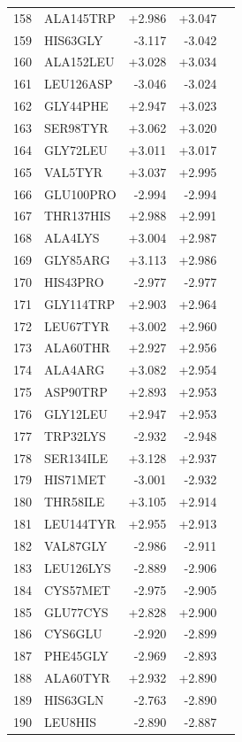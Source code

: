 \begin{longtable}{r l r r c}
158 & ALA145TRP & +2.986 & +3.047 &  \\
159 & HIS63GLY & -3.117 & -3.042 &  \\
160 & ALA152LEU & +3.028 & +3.034 &  \\
161 & LEU126ASP & -3.046 & -3.024 &  \\
162 & GLY44PHE & +2.947 & +3.023 &  \\
163 & SER98TYR & +3.062 & +3.020 &  \\
164 & GLY72LEU & +3.011 & +3.017 &  \\
165 & VAL5TYR & +3.037 & +2.995 &  \\
166 & GLU100PRO & -2.994 & -2.994 &  \\
167 & THR137HIS & +2.988 & +2.991 &  \\
168 & ALA4LYS & +3.004 & +2.987 &  \\
169 & GLY85ARG & +3.113 & +2.986 &  \\
170 & HIS43PRO & -2.977 & -2.977 &  \\
171 & GLY114TRP & +2.903 & +2.964 &  \\
172 & LEU67TYR & +3.002 & +2.960 &  \\
173 & ALA60THR & +2.927 & +2.956 &  \\
174 & ALA4ARG & +3.082 & +2.954 &  \\
175 & ASP90TRP & +2.893 & +2.953 &  \\
176 & GLY12LEU & +2.947 & +2.953 &  \\
177 & TRP32LYS & -2.932 & -2.948 &  \\
178 & SER134ILE & +3.128 & +2.937 &  \\
179 & HIS71MET & -3.001 & -2.932 &  \\
180 & THR58ILE & +3.105 & +2.914 &  \\
181 & LEU144TYR & +2.955 & +2.913 &  \\
182 & VAL87GLY & -2.986 & -2.911 &  \\
183 & LEU126LYS & -2.889 & -2.906 &  \\
184 & CYS57MET & -2.975 & -2.905 &  \\
185 & GLU77CYS & +2.828 & +2.900 &  \\
186 & CYS6GLU & -2.920 & -2.899 &  \\
187 & PHE45GLY & -2.969 & -2.893 &  \\
188 & ALA60TYR & +2.932 & +2.890 &  \\
189 & HIS63GLN & -2.763 & -2.890 &  \\
190 & LEU8HIS & -2.890 & -2.887 &  \\

\end{longtable}
